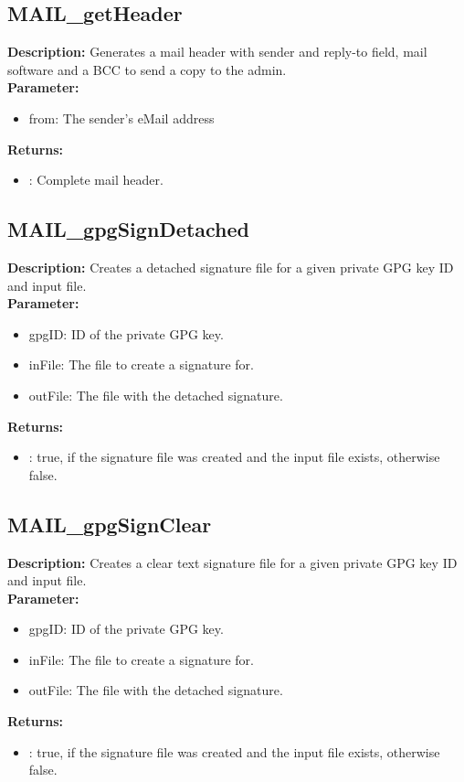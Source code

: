 \subsection{MAIL\_getHeader}
\textbf{Description:} Generates a mail header with sender and reply-to field, mail software and a BCC to send a copy to the admin.\\
\textbf{Parameter:}
\begin{itemize}
\item from: The sender's eMail address
\end{itemize}
\textbf{Returns:}
\begin{itemize}
\item : Complete mail header.
\end{itemize}

\subsection{MAIL\_gpgSignDetached}
\textbf{Description:} Creates a detached signature file for a given private GPG key ID and input file.\\
\textbf{Parameter:}
\begin{itemize}
\item gpgID: ID of the private GPG key.
\item inFile: The file to create a signature for.
\item outFile: The file with the detached signature.
\end{itemize}
\textbf{Returns:}
\begin{itemize}
\item : true, if the signature file was created and the input file exists, otherwise false.
\end{itemize}

\subsection{MAIL\_gpgSignClear}
\textbf{Description:} Creates a clear text signature file for a given private GPG key ID and input file.\\
\textbf{Parameter:}
\begin{itemize}
\item gpgID: ID of the private GPG key.
\item inFile: The file to create a signature for.
\item outFile: The file with the detached signature.
\end{itemize}
\textbf{Returns:}
\begin{itemize}
\item : true, if the signature file was created and the input file exists, otherwise false.
\end{itemize}


